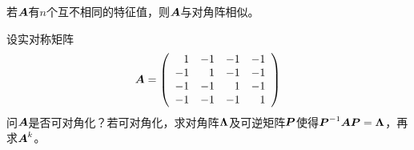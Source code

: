 \begin{frame}[fragile]\ft{\secname}



\begin{tuilun}
  若$\boldsymbol{A}$有$n$个互不相同的特征值，则$\boldsymbol{A}$与对角阵相似。
\end{tuilun}


\end{frame}

\begin{frame}[fragile]\ft{\secname}



\begin{li}
  设实对称矩阵
  $$
  \boldsymbol{A}=\left(
    \begin{array}{rrrr}
      1&-1&-1&-1\\
      -1&1&-1&-1\\
      -1&-1&1&-1\\
      -1&-1&-1&1
    \end{array}
  \right)
  $$
  问$\boldsymbol{A}$是否可对角化？若可对角化，求对角阵$\boldsymbol{\Lambda}$及可逆矩阵$\boldsymbol{P}$使得$\boldsymbol{P}^{-1}\boldsymbol{A}\boldsymbol{P}=\boldsymbol{\Lambda}$，再求$\boldsymbol{A}^k$。
\end{li}
\end{frame}

